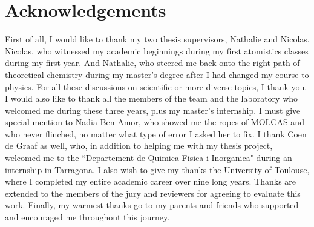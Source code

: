 \documentclass[12pt,a4paper]{report}
\numberwithin{equation}{section}
\newcommand{\noun}[1]{\textsc{#1}}
\begin{document}

\newpage
\thispagestyle{empty}

\chapter*{Acknowledgements}

First of all, I would like to thank my two thesis supervisors, Nathalie and Nicolas.
Nicolas, who witnessed my academic beginnings during my first atomistics classes during my first year.
And Nathalie, who steered me back onto the right path of theoretical chemistry during my master's degree after I had changed my course to physics.
For all these discussions on scientific or more diverse topics, I thank you.
I would also like to thank all the members of the team and the laboratory who welcomed me during these three years, plus my master's internship. 
I must give special mention to Nadia Ben Amor, who showed me the ropes of MOLCAS and who never flinched, no matter what type of error I asked her to fix.
I thank Coen de Graaf as well, who, in addition to helping me with my thesis project, welcomed me to the ``Departement de Quimica Fisica i Inorganica"  during an internship in Tarragona.
I also wish to give my thanks the University of Toulouse, where I completed my entire academic career over nine long years.
Thanks are extended to the members of the jury and reviewers for agreeing to evaluate this work.
Finally, my warmest thanks go to my parents and friends who supported and encouraged me throughout this journey.
\end{document}
